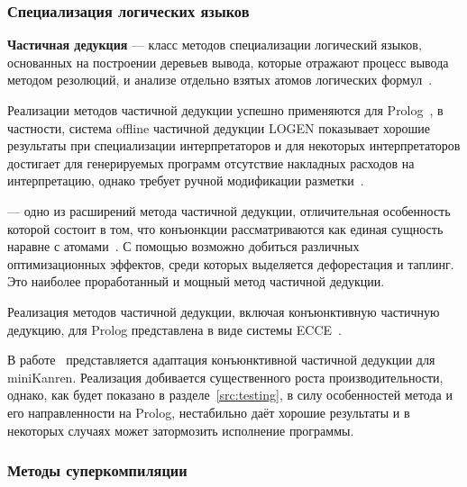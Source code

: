 
\subsubsection{Специализация логических языков}

{\bf Частичная дедукция} --- класс методов специализации логический языков,
основанных на построении деревьев вывода, которые отражают процесс вывода методом
резолюций, и анализе отдельно взятых атомов логических формул~\cite{advanced}.

Реализации методов частичной дедукции успешно применяются для
Prolog~\cite{prologPE},
в частности, система offline частичной дедукции LOGEN
показывает хорошие результаты при специализации интерпретаторов и
для некоторых интерпретаторов достигает для генерируемых программ
отсутствие накладных расходов на интерпретацию,
однако требует ручной модификации разметки~\cite{offlinePD}.

\Cpd --- одно из расширений метода частичной дедукции, отличительная
особенность которой состоит в том, что конъюнкции рассматриваются как
единая сущность наравне с атомами~\cite{cpd}. С помощью \forcpd
возможно добиться различных оптимизационных эффектов, среди которых
выделяется дефорестация и таплинг. Это наиболее проработанный и
мощный метод частичной дедукции.

Реализация методов частичной дедукции, включая конъюнктивную частичную дедукцию, для Prolog
представлена в виде системы ECCE~\cite{ecce}.

В работе~\cite{lozov} представляется адаптация конъюнктивной частичной дедукции для miniKanren.
Реализация добивается существенного роста производительности, однако,
как будет показано в разделе~\ref{src:testing}, в силу особенностей метода и его
направленности на Prolog, нестабильно даёт хорошие результаты и
в некоторых случаях может затормозить исполнение программы.

\subsubsection{Методы суперкомпиляции}

